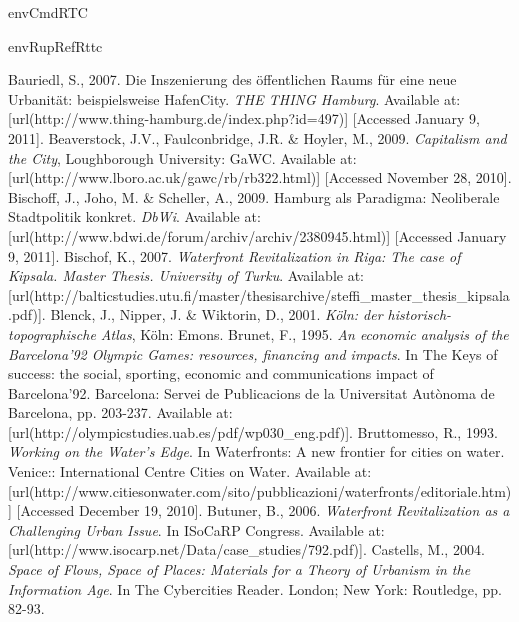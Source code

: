 \environment envCmdRTC

\startenvironment envRupRefRttc

\myRefsOld%
{%
\startREF%
Bauriedl, S., 2007. Die Inszenierung des öffentlichen Raums für eine neue Urbanität: beispielsweise HafenCity. {\em THE THING Hamburg}. Available at:  [url(http://www.thing-hamburg.de/index.php?id=497)] [Accessed January 9, 2011].%
\nl%
Beaverstock, J.V., Faulconbridge, J.R. \& Hoyler, M., 2009. {\em Capitalism and the City}, Loughborough University: GaWC. Available at:  [url(http://www.lboro.ac.uk/gawc/rb/rb322.html)] [Accessed November 28, 2010].%
\nl%
Bischoff, J., Joho, M. \& Scheller, A., 2009. Hamburg als Paradigma: Neoliberale Stadtpolitik konkret. {\em DbWi}. Available at:  [url(http://www.bdwi.de/forum/archiv/archiv/2380945.html)] [Accessed January 9, 2011].%
\nl%
Bischof, K., 2007. {\em Waterfront Revitalization in Riga: The case of Kipsala. Master Thesis. University of Turku}. Available at:  [url(http://balticstudies.utu.fi/master/thesisarchive/steffi_master_thesis_kipsala.pdf)].%
\nl%
Blenck, J., Nipper, J. \& Wiktorin, D., 2001. {\em Köln: der historisch-topographische Atlas}, Köln: Emons.%
\nl%
Brunet, F., 1995. {\em An economic analysis of the Barcelona’92 Olympic Games: resources, financing and impacts}. In The Keys of success: the social, sporting, economic and communications impact of Barcelona’92.  Barcelona: Servei de Publicacions de la Universitat Autònoma de Barcelona, pp. 203-237. Available at:  [url(http://olympicstudies.uab.es/pdf/wp030_eng.pdf)].%
\nl%
Bruttomesso, R., 1993. {\em Working on the Water's Edge}. In Waterfronts: A new frontier for cities on water.  Venice:: International Centre Cities on Water. Available at:  [url(http://www.citiesonwater.com/sito/pubblicazioni/waterfronts/editoriale.htm)] [Accessed December 19, 2010].%
\nl%
Butuner, B., 2006. {\em Waterfront Revitalization as a Challenging Urban Issue}. In ISoCaRP Congress. Available at:  [url(http://www.isocarp.net/Data/case_studies/792.pdf)].%
\nl%
Castells, M., 2004. {\em Space of Flows, Space of Places: Materials for a Theory of Urbanism in the Information Age}. In The Cybercities Reader.  London; New York: Routledge, pp. 82-93.%
}
